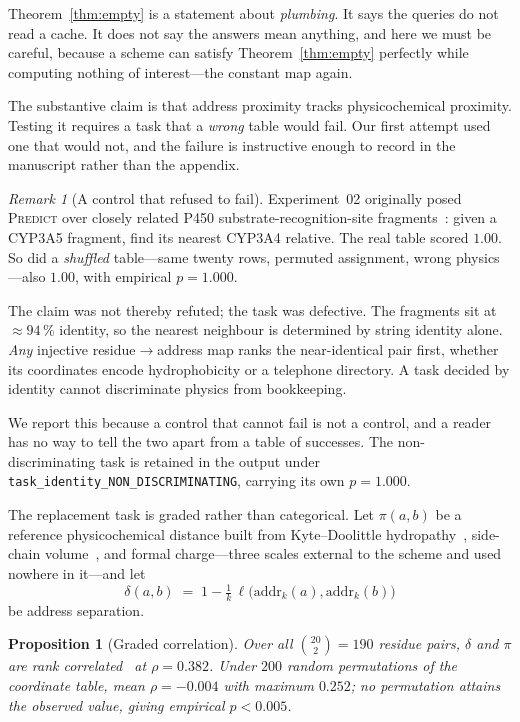 \documentclass[11pt,twocolumn,a4paper]{article}
\newcommand{\addr}{\mathrm{addr}}
\theoremstyle{plain}
\newtheorem{proposition}[theorem]{Proposition}
\theoremstyle{definition}
\theoremstyle{remark}
\newtheorem{remark}{Remark}
\begin{document}
Theorem~\ref{thm:empty} is a statement about \emph{plumbing}. It says the
queries do not read a cache. It does not say the answers mean anything, and
here we must be careful, because a scheme can satisfy
Theorem~\ref{thm:empty} perfectly while computing nothing of interest---the
constant map again.

The substantive claim is that address proximity tracks physicochemical
proximity. Testing it requires a task that a \emph{wrong} table would fail.
Our first attempt used one that would not, and the failure is instructive
enough to record in the manuscript rather than the appendix.

\begin{remark}[A control that refused to fail]
\label{rem:control-refused}
Experiment~02 originally posed \textsc{Predict} over closely related P450
substrate-recognition-site fragments~\citep{Gotoh1992}: given a CYP3A5
fragment, find its nearest CYP3A4 relative. The real table scored $1.00$.
So did a \emph{shuffled} table---same twenty rows, permuted assignment,
wrong physics---also $1.00$, with empirical $p = 1.000$.

The claim was not thereby refuted; the task was defective. The fragments sit
at ${\approx}94\,\%$ identity, so the nearest neighbour is determined by
string identity alone. \emph{Any} injective residue$\to$address map ranks the
near-identical pair first, whether its coordinates encode hydrophobicity or
a telephone directory. A task decided by identity cannot discriminate
physics from bookkeeping.

We report this because a control that cannot fail is not a control, and a
reader has no way to tell the two apart from a table of successes. The
non-discriminating task is retained in the output under
\texttt{task\_identity\_NON\_DISCRIMINATING}, carrying its own $p = 1.000$.
\end{remark}

The replacement task is graded rather than categorical. Let $\pi(a,b)$ be a
reference physicochemical distance built from Kyte--Doolittle
hydropathy~\citep{KyteDoolittle1982}, side-chain
volume~\citep{Zamyatnin1972}, and formal charge---three scales external to
the scheme and used nowhere in it---and let
\[
  \delta(a,b) \;=\; 1 - \tfrac{1}{k}\,\ell\bigl(\addr_{k}(a), \addr_{k}(b)\bigr)
\]
be address separation.

\begin{proposition}[Graded correlation]
\label{prop:graded}
Over all $\binom{20}{2} = 190$ residue pairs, $\delta$ and $\pi$ are rank
correlated~\citep{Spearman1904} at $\rho = 0.382$. Under $200$ random
permutations of the coordinate table, mean $\rho = -0.004$ with maximum
$0.252$; no permutation attains the observed value, giving empirical
$p < 0.005$.
\end{proposition}
\end{document}
